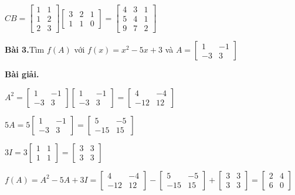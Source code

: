 \documentclass[12pt]{report}
\begin{document}
$CB = \begin{bmatrix} 1 & 1 \\ 1 & 2 \\ 2 & 3 \end{bmatrix} \begin{bmatrix} 3 & 2 & 1 \\ 1 & 1 & 0 \end{bmatrix} = \begin{bmatrix} 4 & 3 & 1 \\ 5 & 4 & 1 \\ 9 & 7 & 2 \end{bmatrix}$

\textbf{Bài 3.}Tìm $f(A)$ với $f(x) = x^2 - 5x + 3$ và $A = \begin{bmatrix} 1 & -1 \\ -3 & 3 \end{bmatrix}$ \newpage

\textbf{Bài giải.}

$A^2 = \begin{bmatrix} 1 & -1 \\ -3 & 3 \end{bmatrix} \begin{bmatrix} 1 & -1 \\ -3 & 3 \end{bmatrix} = \begin{bmatrix} 4 & -4 \\ -12 & 12 \end{bmatrix}$

$5A = 5\begin{bmatrix} 1 & -1 \\ -3 & 3 \end{bmatrix} = \begin{bmatrix} 5 & -5 \\ -15 & 15 \end{bmatrix}$

$3I = 3\begin{bmatrix} 1 & 1 \\ 1 & 1 \end{bmatrix} = \begin{bmatrix} 3 & 3 \\ 3 & 3 \end{bmatrix}$

$f(A) = A^2 - 5A + 3I = \begin{bmatrix} 4 & -4 \\ -12 & 12 \end{bmatrix} - \begin{bmatrix} 5 & -5 \\ -15 & 15 \end{bmatrix} + \begin{bmatrix} 3 & 3 \\ 3 & 3 \end{bmatrix} = \begin{bmatrix} 2 & 4 \\ 6 & 0 \end{bmatrix}$
\end{document}
